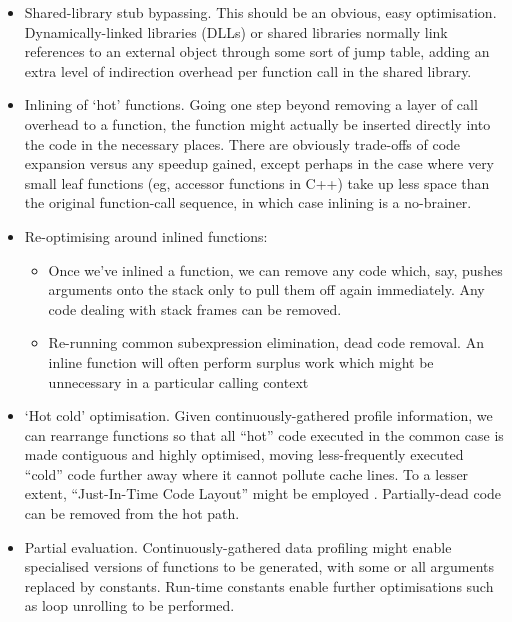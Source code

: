\begin{itemize}
\item Shared-library stub bypassing. This should be an obvious, easy optimisation. Dynamically-linked libraries (DLLs) or shared libraries normally link references to an external object through some sort of jump table, adding an extra level of indirection overhead per function call in the shared library. 

\item Inlining of `hot' functions. Going one step beyond removing a layer of call overhead to a function, the function might actually be inserted directly into the code in the necessary places. There are obviously trade-offs of code expansion versus any speedup gained, except perhaps in the case where very small leaf functions (eg, accessor functions in C++) take up less space than the original function-call sequence, in which case inlining is a no-brainer.

\item Re-optimising around inlined functions:

\begin{itemize}

\item Once we've inlined a function, we can remove any code which, say,
pushes arguments onto the stack only to pull them off again immediately.
Any code dealing with stack frames can be removed.

\item Re-running common subexpression elimination, dead code removal. An
inline function will often perform surplus work which might be unnecessary
in a particular calling context
\end{itemize}

\item `Hot cold' optimisation. Given continuously-gathered profile information,
we can rearrange functions so that all {}``hot'' code executed in
the common case is made contiguous and highly optimised, moving less-frequently
executed {}``cold'' code further away where it cannot pollute cache
lines. \cite{BL 94,CL 96} To a lesser extent, {}``Just-In-Time Code
Layout'' might be employed \cite{key-1}. Partially-dead code can be removed from the hot path.

\item Partial evaluation. Continuously-gathered data profiling might enable
specialised versions of functions to be generated, with some or all
arguments replaced by constants. Run-time constants enable further
optimisations such as loop unrolling to be performed. \cite{LL 96}


\end{itemize}
